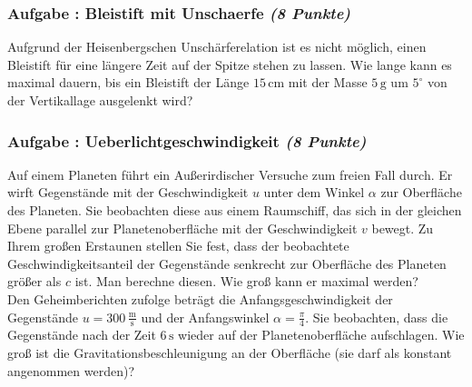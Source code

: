 \documentclass[12pt,a4paper]{article}
\newcommand{\unit}[1]{\,\mathrm{#1}}
\newcounter{numlabel}
\newenvironment{problem}[2]{\stepcounter{numlabel} \vspace{1ex} \subsubsection*{Aufgabe \the\value{numlabel}: #1 \emph{(#2 Punkte)}} \renewcommand{\Currentlabel}{Aufgabe \the\value{numlabel}: #1}}{

}
\begin{document}
\begin{problem}{Bleistift mit Unschaerfe}{8}
Aufgrund der Heisenbergschen Unschärferelation ist es nicht möglich, einen Bleistift für eine längere Zeit auf der Spitze stehen zu lassen. Wie lange kann es maximal dauern, bis ein Bleistift der Länge $15\unit{cm}$ mit der Masse $5\unit{g}$ um $5^\circ$ von der Vertikallage ausgelenkt wird?
\end{problem}

\begin{problem}{Ueberlichtgeschwindigkeit}{8}
Auf einem Planeten führt ein Außerirdischer Versuche zum freien Fall durch. Er wirft Gegenstände mit der Geschwindigkeit $u$ unter dem Winkel $\alpha$ zur Oberfläche des Planeten. Sie beobachten diese aus einem Raumschiff, das sich in der gleichen Ebene parallel zur Planetenoberfläche mit der Geschwindigkeit $v$ bewegt. Zu Ihrem großen Erstaunen stellen Sie fest, dass der beobachtete Geschwindigkeitsanteil der Gegenstände senkrecht zur Oberfläche des Planeten größer als $c$ ist. Man berechne diesen. Wie groß kann er maximal werden?\\
Den Geheimberichten zufolge beträgt die Anfangsgeschwindigkeit der Gegenstände $u=300 \unit{\frac{m}{s}}$ und der Anfangswinkel $\alpha=\frac{\pi}{4}$. Sie beobachten, dass die Gegenstände nach der Zeit $6\unit{s}$ wieder auf der Planetenoberfläche aufschlagen. Wie groß ist die Gravitationsbeschleunigung an der Oberfläche (sie darf als konstant angenommen werden)?
\end{problem}
















\end{document}
